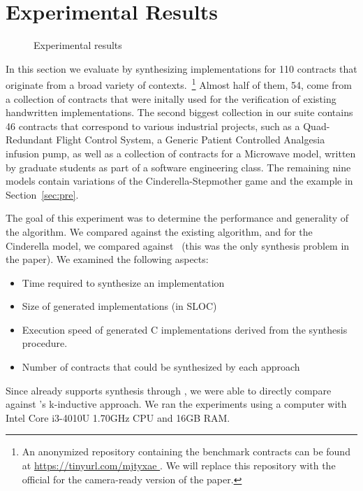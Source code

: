 \section{Experimental Results}
\label{sec:results}

\begin{figure}[!t]
\centering
{}
\quad
{}
\quad
{}
\caption{Experimental results}
\label{fg:results}
\end{figure}

In this section we evaluate \jsynvg by synthesizing implementations
for 110 contracts that originate from a broad variety of contexts.~\footnote{An
anonymized repository containing the benchmark contracts can be found at
\url{https://tinyurl.com/mjtyxae }. We will replace this repository with the official for the camera-ready
version of the paper.} Almost half of them, 54, come from a collection of contracts that were initally used for the verification of existing handwritten implementations. The second biggest collection in our suite contains 46 contracts that correspond to various industrial projects, such as a Quad-Redundant Flight Control System, a Generic Patient Controlled Analgesia infusion pump, as well as a collection of contracts
for a Microwave model, written by graduate students as part of a software
engineering class. The remaining nine models contain variations of the
Cinderella-Stepmother game and the example in Section~\ref{sec:pre}.

The goal of this experiment was to determine the performance and generality of the \jsynvg algorithm.  We compared against the existing \jsyn algorithm, and for the Cinderella model, we compared against~\cite{beyene2014constraint} (this was the only synthesis problem in the paper).  We examined the following aspects: 
\begin{itemize}
    \item Time required to synthesize an implementation
    \item Size of generated implementations (in SLOC)
    \item Execution speed of generated C implementations derived from the synthesis procedure.
    \item Number of contracts that could be synthesized by each approach
\end{itemize}
\noindent Since \jkind already supports synthesis through \jsyn, we were able to directly
compare \jsynvg against \jsyn's k-inductive approach. We
ran the experiments using a computer with Intel Core i3-4010U 1.70GHz CPU and
16GB RAM.

